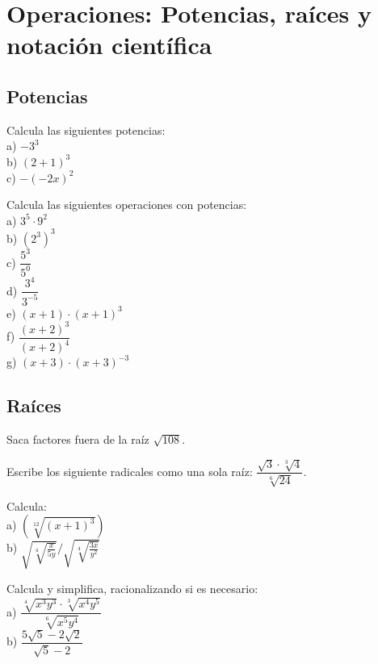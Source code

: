\section{Operaciones: Potencias, raíces y notación científica}

\subsection{Potencias}

\begin{ejer}
Calcula las siguientes potencias: \\
a) $-3^3$ \\ b) $(2+1)^3$ \\ c) $-(-2x)^2$
\end{ejer}

\begin{ejer}
Calcula las siguientes operaciones con potencias: \\
a) $3^5\cdot 9^2$ \\
b) $(2^3)^3$ \\
c) $\dfrac{5^3}{5^0}$ \\
d) $\dfrac{3^4}{3^{-5}}$ \\
e) $(x+1)\cdot (x+1)^3$ \\
f) $\dfrac{(x+2)^3}{(x+2)^4}$ \\
g) $(x+3) \cdot (x+3)^{-3}$
\end{ejer}

\subsection{Raíces}

\begin{ejer}
Saca factores fuera de la raíz $\sqrt{108}$.
\end{ejer}

\begin{ejer}
Escribe los siguiente radicales como una sola raíz: $\dfrac{\sqrt{3}\cdot \sqrt[3]{4}}{\sqrt[6]{24}}$.
\end{ejer}

\begin{ejer}
Calcula: \\
a) $\left( \sqrt[12]{(x+1)^3} \right) $ \\
b) $\sqrt{\sqrt[4]{\frac{x}{5y}}} / \sqrt{ \sqrt[4]{\frac{3x}{y^2}}}$
\end{ejer}

\begin{ejer}
Calcula y simplifica, racionalizando si es necesario: \\
a) $\dfrac{\sqrt[4]{x^3y^3} \cdot \sqrt[3]{x^4y^5}}{\sqrt[6]{x^5y^4}}$ \\
b) $\dfrac{5\sqrt{5}-2\sqrt{2}}{\sqrt{5}-2}$
\end{ejer}

